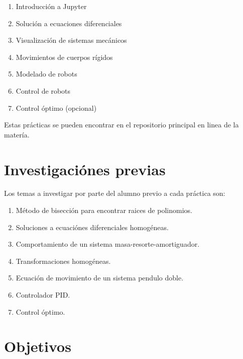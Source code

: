 	\begin{enumerate}
		\item Introducción a Jupyter
		\item Solución a ecuaciones diferenciales
		\item Visualización de sistemas mecánicos
		\item Movimientos de cuerpos rígidos
		\item Modelado de robots
		\item Control de robots
		\item Control óptimo (opcional)
	\end{enumerate}

	Estas prácticas se pueden encontrar en el repositorio principal en linea de la matería\cite{github:dinamica}.


\section{Investigaciónes previas}

	Los temas a investigar por parte del alumno previo a cada práctica son:

	\begin{enumerate}
		\item Método de bisección para encontrar raices de polinomios\cite{metodos:2007}.
		\item Soluciones a ecuaciónes diferenciales homogéneas\cite{metodos:2007}.
		\item Comportamiento de un sistema masa-resorte-amortiguador\cite{apuntes:2014}.
		\item Transformaciones homogéneas\cite{robotica:2005}.
		\item Ecuación de movimiento de un sistema pendulo doble\cite{apuntes:2014}.
		\item Controlador PID\cite{control:2010}.
		\item Control óptimo\cite{control:2010}.
	\end{enumerate}


\section{Objetivos}

